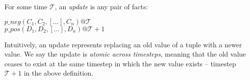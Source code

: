 \documentclass{acm_proc_article-sp-sigmod09}
\newcommand{\Tau}{\mathcal{T}}
\begin{document}
%
For some time $\Tau$, an {\em update} is any pair of facts:

$p\_neg(C_{1},C_{2},[...],C_{n})@\Tau$ \\ $p\_pos(D_{1},D_{2},[...],D_{n})@\Tau+1$
%

Intuitively, an update represents replacing an old value of a tuple with a
newer value.  We say the update is {\em atomic across timesteps}, meaning that
the old value ceases to exist at the same timestep in which the new value
exists -- timestep $\Tau+1$ in the above definition.
\end{document}
